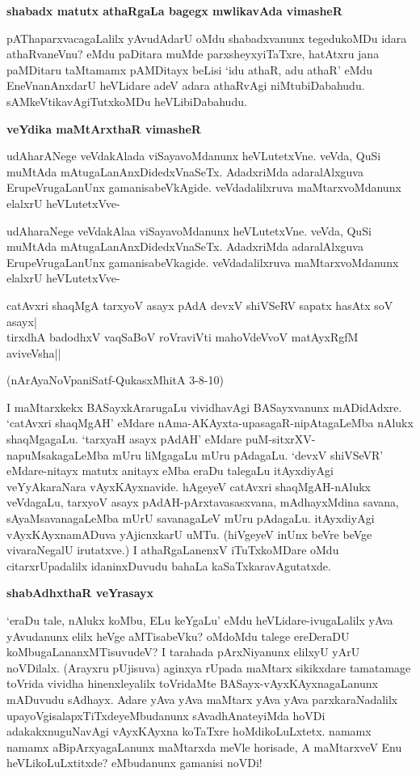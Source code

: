 \textbf{shabadx matutx athaRgaLa bagegx mwlikavAda vimasheR}

pAThaparxvacagaLalilx yAvudAdarU oMdu shabadxvanunx tegedukoMDu idara 
athaRvaneVnu? eMdu paDitara muMde parxsheyxyiTaTxre, hatAtxru jana paMDitaru taMtamamx pAMDitayx beLisi `idu athaR, adu athaR' eMdu EneVnanAnxdarU heVLidare adeV adara athaRvAgi niMtubiDabahudu. sAMkeVtikavAgiTutxkoMDu heVLibiDabahudu.

\textbf{veYdika maMtArxthaR vimasheR}

udAharANege veVdakAlada viSayavoMdanunx heVLutetxVne. veVda, QuSi 
muMtAda mAtugaLanAnxDidedxVnaSeTx. AdadxriMda adaralAlxguva 
ErupeVrugaLanUnx gamanisabeVkAgide. veVdadalilxruva maMtarxvoMdanunx elalxrU heVLutetxVve-

udAharaNege veVdakAlaa viSayavoMdanunx heVLutetxVne. veVda, QuSi muMtAda mAtugaLanAnxDidedxVnaSeTx. AdadxriMda adaralAlxguva ErupeVrugaLanUnx gamanisabeVkagide. veVdadalilxruva maMtarxvoMdanunx elalxrU heVLutetxVve-

\begin{shloka}
catAvxri shaqMgA tarxyoV asayx pAdA devxV shiVSeRV sapatx hasAtx soV asayx|\\
tirxdhA badodhxV vaqSaBoV roVraviVti mahoVdeVvoV matAyxRgfM aviveVsha||
\end{shloka}

(nArAyaNoVpaniSatf-QukasxMhitA 3-8-10)

I maMtarxkekx BASayxkArarugaLu vividhavAgi BASayxvanunx mADidAdxre. 
`catAvxri shaqMgAH' eMdare nAma-AKAyxta-upasagaR-nipAtagaLeMba nAlukx 
shaqMgagaLu. `tarxyaH asayx pAdAH' eMdare puM-sitxrXV-napuMsakagaLeMba 
mUru liMgagaLu mUru pAdagaLu. `devxV shiVSeVR' eMdare-nitayx matutx 
anitayx eMba eraDu talegaLu itAyxdiyAgi veYyAkaraNara vAyxKAyxnavide. hAgeyeV catAvxri shaqMgAH-nAlukx veVdagaLu, tarxyoV asayx pAdAH-pArxtavasasxvana, mAdhayxMdina savana, sAyaMsavanagaLeMba mUrU savanagaLeV mUru pAdagaLu. itAyxdiyAgi vAyxKAyxnamADuva yAjicnxkarU uMTu. (hiVgeyeV inUnx beVre beVge vivaraNegalU irutatxve.) I athaRgaLanenxV iTuTxkoMDare oMdu citarxrUpadalilx idaninxDuvudu bahaLa kaSaTxkaravAgutatxde.

\textbf{shabAdhxthaR veYrasayx}

`eraDu tale, nAlukx koMbu, ELu keYgaLu' eMdu heVLidare-ivugaLalilx yAva 
yAvudanunx elilx heVge aMTisabeVku? oMdoMdu talege ereDeraDU koMbugaLananxMTisuvudeV? I tarahada pArxNiyanunx elilxyU yArU noVDilalx. (Arayxru pUjisuva) aginxya rUpada maMtarx sikikxdare tamatamage toVrida vividha hinenxleyalilx toVridaMte BASayx-vAyxKAyxnagaLanunx mADuvudu sAdhayx. Adare yAva yAva maMtarx yAva yAva parxkaraNadalilx upayoVgisalapxTiTxdeyeMbudanunx sAvadhAnateyiMda hoVDi adakakxnuguNavAgi vAyxKAyxna koTaTxre hoMdikoLuLxtetx. namamx namamx aBipArxyagaLanunx maMtarxda meVle horisade, A maMtarxveV Enu heVLikoLuLxtitxde? eMbudanunx gamanisi noVDi!

